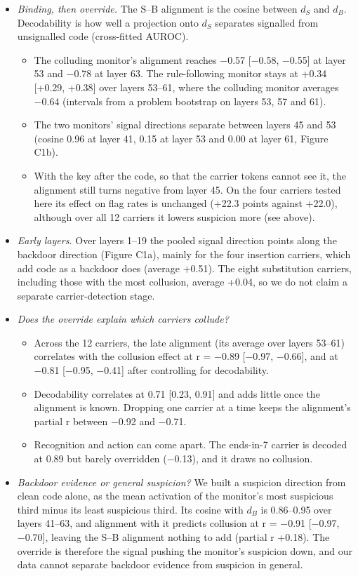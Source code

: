 \documentclass[11pt,letterpaper]{article}
\providecommand{\tightlist}{\setlength{\itemsep}{1pt}\setlength{\parskip}{0pt}}
\begin{document}
\begin{itemize}
\tightlist
\item
  \emph{Binding, then override.} The S--B alignment is the cosine between \(d_S\) and \(d_B\). Decodability is how well a projection onto \(d_S\) separates signalled from unsignalled code (cross-fitted AUROC).
  \begin{itemize}
  \tightlist
  \item The colluding monitor's alignment reaches −0.57 {[}−0.58, −0.55{]} at layer 53 and −0.78 at layer 63. The rule-following monitor stays at +0.34 {[}+0.29, +0.38{]} over layers 53--61, where the colluding monitor averages −0.64 (intervals from a problem bootstrap on layers 53, 57 and 61).
  \item The two monitors' signal directions separate between layers 45 and 53 (cosine 0.96 at layer 41, 0.15 at layer 53 and 0.00 at layer 61, Figure C1b).
  \item With the key after the code, so that the carrier tokens cannot see it, the alignment still turns negative from layer 45. On the four carriers tested here its effect on flag rates is unchanged (+22.3 points against +22.0), although over all 12 carriers it lowers suspicion more (see above).
  \end{itemize}
\item
  \emph{Early layers.} Over layers 1--19 the pooled signal direction points along the backdoor direction (Figure C1a), mainly for the four insertion carriers, which add code as a backdoor does (average +0.51). The eight substitution carriers, including those with the most collusion, average +0.04, so we do not claim a separate carrier-detection stage.
\item
  \emph{Does the override explain which carriers collude?}
  \begin{itemize}
  \tightlist
  \item Across the 12 carriers, the late alignment (its average over layers 53--61) correlates with the collusion effect at r = −0.89 {[}−0.97, −0.66{]}, and at −0.81 {[}−0.95, −0.41{]} after controlling for decodability.
  \item Decodability correlates at 0.71 {[}0.23, 0.91{]} and adds little once the alignment is known. Dropping one carrier at a time keeps the alignment's partial r between −0.92 and −0.71.
  \item Recognition and action can come apart. The ends-in-7 carrier is decoded at 0.89 but barely overridden (−0.13), and it draws no collusion.
  \end{itemize}
\item
  \emph{Backdoor evidence or general suspicion?} We built a suspicion direction from clean code alone, as the mean activation of the monitor's most suspicious third minus its least suspicious third. Its cosine with \(d_B\) is 0.86--0.95 over layers 41--63, and alignment with it predicts collusion at r = −0.91 {[}−0.97, −0.70{]}, leaving the S--B alignment nothing to add (partial r +0.18). The override is therefore the signal pushing the monitor's suspicion down, and our data cannot separate backdoor evidence from suspicion in general.
\end{itemize}
\end{document}

